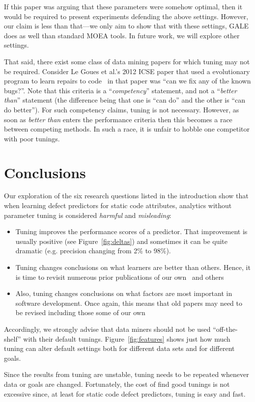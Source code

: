 \documentclass{sig-alternative}
\newcommand{\bi}{\begin{itemize}[leftmargin=0.4cm]}
\newcommand{\ei}{\end{itemize}}
\newcommand{\fig}[1]{Figure~\ref{fig:#1}}
\begin{document}
If this paper was arguing that these parameters were
somehow optimal, then it would be required to present
experiments defending the above settings. However, our
claim is less than that—we only aim to show that with
these settings, GALE does as well than standard MOEA
tools. In future work, we will explore other settings.




That said, there exist some class of data mining papers for which
tuning may not be required. Consider  Le Goues et al.'s 2012
ICSE paper that used a evolutionary program to learn
repairs to code~
in that paper was ``can we fix any of the known bugs?''. Note
that this criteria is a ``{\em competency}'' statement, and
not a ``{\em better than}'' statement (the difference being that
one is 
``can do'' and the other is ``can do better''). For such
competency claims, tuning is not necessary. However, as soon
as {\em better than} enters the performance criteria then this
becomes a race between competing methods. In such a race,
it is unfair to hobble one competitor with poor tunings.



\section{Conclusions}

Our exploration of the six research
questions listed in the introduction
show that when learning defect predictors for static code
attributes,   analytics without parameter tuning is considered {\em harmful} and {\em misleading}:
\bi
\item Tuning improves the performance scores of a predictor.
That improvement is usually positive (see \fig{deltas}) and sometimes
it can be quite   dramatic (e.g. precision changing from 2\% to 98\%). \item 
Tuning changes conclusions on what learners are better than others.
Hence, it is time to revisit numerous prior publications of our own~
and others~
\item
Also,
tuning changes conclusions on what factors are most important in software development.
Once again, this means that old papers may need to be revised including those
some of our own~
\ei
Accordingly, we strongly advise that data miners should not be used ``off-the-shelf'' with their default tunings. 
\fig{features} shows just how much tuning can alter default settings
both for different data sets and for different goals. 

Since the results from tuning are unstable,
tuning needs to be repeated
whenever data or goals are changed.
Fortunately, the cost of find good tunings is not excessive since, at least for
static code defect predictors, tuning is easy and fast.
\end{document}
